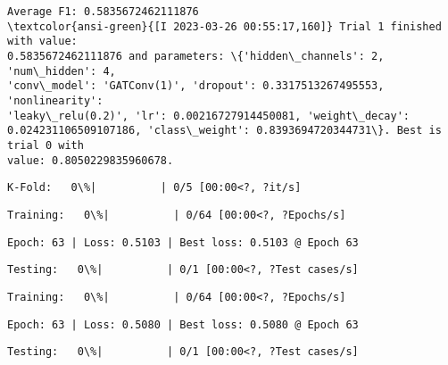 \documentclass[11pt]{article}
\begin{document}
    
    \begin{Verbatim}[commandchars=\\\{\}]
Average F1: 0.5835672462111876
\textcolor{ansi-green}{[I 2023-03-26 00:55:17,160]} Trial 1 finished with value:
0.5835672462111876 and parameters: \{'hidden\_channels': 2, 'num\_hidden': 4,
'conv\_model': 'GATConv(1)', 'dropout': 0.3317513267495553, 'nonlinearity':
'leaky\_relu(0.2)', 'lr': 0.00216727914450081, 'weight\_decay':
0.024231106509107186, 'class\_weight': 0.8393694720344731\}. Best is trial 0 with
value: 0.8050229835960678.
    \end{Verbatim}

    
    \begin{Verbatim}[commandchars=\\\{\}]
K-Fold:   0\%|          | 0/5 [00:00<?, ?it/s]
    \end{Verbatim}

    
    
    \begin{Verbatim}[commandchars=\\\{\}]
Training:   0\%|          | 0/64 [00:00<?, ?Epochs/s]
    \end{Verbatim}

    
    \begin{Verbatim}[commandchars=\\\{\}]
Epoch: 63 | Loss: 0.5103 | Best loss: 0.5103 @ Epoch 63
    \end{Verbatim}

    
    \begin{Verbatim}[commandchars=\\\{\}]
Testing:   0\%|          | 0/1 [00:00<?, ?Test cases/s]
    \end{Verbatim}

    
    
    \begin{Verbatim}[commandchars=\\\{\}]
Training:   0\%|          | 0/64 [00:00<?, ?Epochs/s]
    \end{Verbatim}

    
    \begin{Verbatim}[commandchars=\\\{\}]
Epoch: 63 | Loss: 0.5080 | Best loss: 0.5080 @ Epoch 63
    \end{Verbatim}

    
    \begin{Verbatim}[commandchars=\\\{\}]
Testing:   0\%|          | 0/1 [00:00<?, ?Test cases/s]
    \end{Verbatim}
\end{document}
